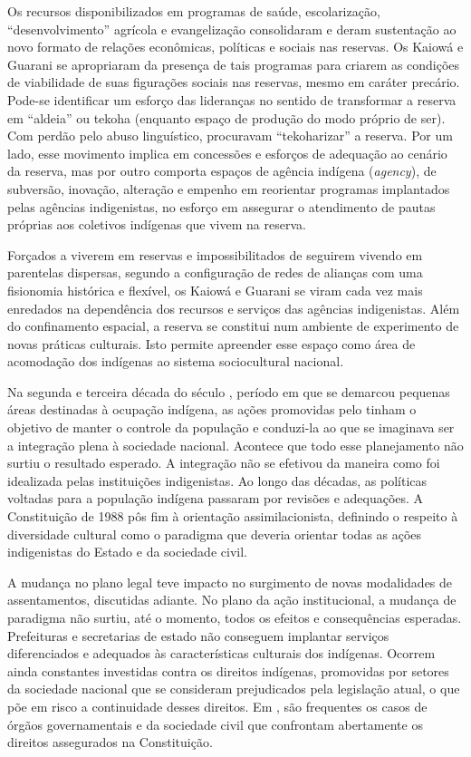 {{Os recursos disponibilizados em programas de saúde, escolarização,
``desenvolvimento'' agrícola e evangelização consolidaram e deram
sustentação ao novo formato de relações econômicas, políticas e sociais
nas reservas. Os Kaiowá e Guarani se apropriaram da presença de tais
programas para criarem as condições de viabilidade de suas figurações
sociais nas reservas, mesmo em caráter precário. Pode-se identificar um
esforço das lideranças no sentido de transformar a reserva em ``aldeia''
ou tekoha (enquanto espaço de produção do modo próprio de ser). Com
perdão pelo abuso linguístico, procuravam ``tekoharizar'' a reserva. Por
um lado, esse movimento implica em concessões e esforços de adequação
ao cenário da reserva, mas por outro comporta espaços de agência
indígena (\emph{agency}), de subversão, inovação, alteração e empenho em
reorientar programas implantados pelas agências indigenistas, no
esforço em assegurar o atendimento de pautas próprias aos coletivos
indígenas que vivem na reserva.  

Forçados a viverem em reservas e impossibilitados de seguirem vivendo em
parentelas dispersas, segundo a configuração de redes de alianças com
uma fisionomia histórica e flexível, os Kaiowá e Guarani se viram cada
vez mais enredados na dependência dos recursos e serviços das agências
indigenistas. Além do confinamento espacial, a reserva se constitui num
ambiente de experimento de novas práticas culturais. Isto permite
apreender esse espaço como área de acomodação dos indígenas ao sistema
sociocultural nacional.

Na segunda e terceira década do século , período em que se demarcou
pequenas áreas destinadas à ocupação indígena, as ações promovidas pelo
 tinham o objetivo de manter o controle da população e conduzi-la ao
que se imaginava ser a integração plena à sociedade nacional. Acontece
que todo esse planejamento não surtiu o resultado esperado. A
integração não se efetivou da maneira como foi idealizada pelas
instituições indigenistas. Ao longo das décadas, as políticas voltadas
para a população indígena passaram por revisões e adequações. A
Constituição de 1988 pôs fim à orientação assimilacionista, definindo o
respeito à diversidade cultural como o paradigma que deveria orientar
todas as ações indigenistas do Estado e da sociedade civil. 

A mudança no plano legal teve impacto no surgimento de novas modalidades
de assentamentos, discutidas adiante. No plano da ação institucional, a
mudança de paradigma não surtiu, até o momento, todos os efeitos e
consequências esperadas. Prefeituras e secretarias de estado não
conseguem implantar serviços diferenciados e adequados às
características culturais dos indígenas. Ocorrem ainda constantes
investidas contra os direitos indígenas, promovidas por setores da
sociedade nacional que se consideram prejudicados pela legislação
atual, o que põe em risco a continuidade desses direitos. Em , são
frequentes os casos de órgãos governamentais e da sociedade civil que
confrontam abertamente os direitos assegurados na Constituição.

}}
